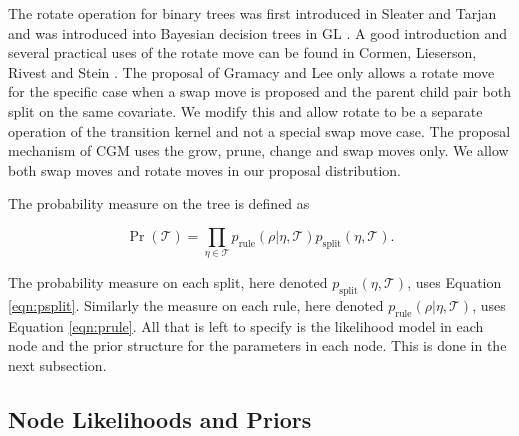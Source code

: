 \documentclass{article}
\begin{document}
  The rotate operation for binary trees was first introduced in Sleater and Tarjan \cite{sleator1985self} and was introduced into Bayesian decision trees in GL \cite{gramacy2008bayesian}. A good introduction and several practical uses of the rotate move can be found in Cormen, Lieserson, Rivest and Stein \cite{cormen2001introduction}. The proposal of Gramacy and Lee \cite{gramacy2008bayesian} only allows a rotate move for the specific case when a swap move is proposed and the parent child pair both split on the same covariate. We modify this and allow rotate to be a separate operation of the transition kernel and not a special swap move case. The proposal mechanism of CGM uses the grow, prune, change and swap moves only. We allow both swap moves and rotate moves in our proposal distribution.  
  
 The probability measure on the tree is defined as 
 
 \begin{equation}
 \Pr(\mathcal{T}) = \prod_{\eta \in \mathcal{T}} p_{\text{rule}}(\rho \vert \eta, \mathcal{T})p_{\text{split}}(\eta, \mathcal{T}).
\end{equation}

The probability measure on each split, here denoted $p_{\text{split}}(\eta, \mathcal{T})$, uses Equation \ref{eqn:psplit}. Similarly the measure on each rule, here denoted $p_{\text{rule}}(\rho \vert \eta, \mathcal{T})$, uses Equation \ref{eqn:prule}. 
All that is left to specify is the likelihood model in each node and the prior structure for the parameters in each node. This is done in the next subsection. 

\subsection{Node Likelihoods and Priors}
\end{document}
